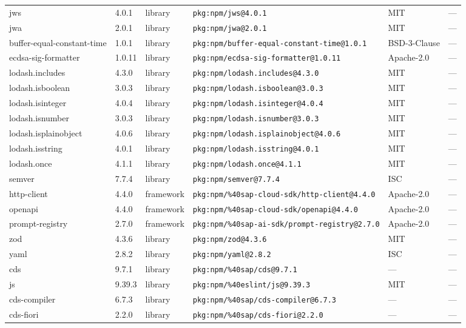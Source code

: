 \documentclass[11pt]{article}
\begin{document}
\begin{longtable}{|l|l|l|p{2.2cm}|l|p{4cm}|}
jws & 4.0.1 & library & \texttt{pkg:npm/jws@4.0.1} & MIT & — \\
jwa & 2.0.1 & library & \texttt{pkg:npm/jwa@2.0.1} & MIT & — \\
buffer-equal-constant-time & 1.0.1 & library & \texttt{pkg:npm/buffer-equal-constant-time@1.0.1} & BSD-3-Clause & — \\
ecdsa-sig-formatter & 1.0.11 & library & \texttt{pkg:npm/ecdsa-sig-formatter@1.0.11} & Apache-2.0 & — \\
lodash.includes & 4.3.0 & library & \texttt{pkg:npm/lodash.includes@4.3.0} & MIT & — \\
lodash.isboolean & 3.0.3 & library & \texttt{pkg:npm/lodash.isboolean@3.0.3} & MIT & — \\
lodash.isinteger & 4.0.4 & library & \texttt{pkg:npm/lodash.isinteger@4.0.4} & MIT & — \\
lodash.isnumber & 3.0.3 & library & \texttt{pkg:npm/lodash.isnumber@3.0.3} & MIT & — \\
lodash.isplainobject & 4.0.6 & library & \texttt{pkg:npm/lodash.isplainobject@4.0.6} & MIT & — \\
lodash.isstring & 4.0.1 & library & \texttt{pkg:npm/lodash.isstring@4.0.1} & MIT & — \\
lodash.once & 4.1.1 & library & \texttt{pkg:npm/lodash.once@4.1.1} & MIT & — \\
semver & 7.7.4 & library & \texttt{pkg:npm/semver@7.7.4} & ISC & — \\
http-client & 4.4.0 & framework & \texttt{pkg:npm/\%40sap-cloud-sdk/http-client@4.4.0} & Apache-2.0 & — \\
openapi & 4.4.0 & framework & \texttt{pkg:npm/\%40sap-cloud-sdk/openapi@4.4.0} & Apache-2.0 & — \\
prompt-registry & 2.7.0 & framework & \texttt{pkg:npm/\%40sap-ai-sdk/prompt-registry@2.7.0} & Apache-2.0 & — \\
zod & 4.3.6 & library & \texttt{pkg:npm/zod@4.3.6} & MIT & — \\
yaml & 2.8.2 & library & \texttt{pkg:npm/yaml@2.8.2} & ISC & — \\
cds & 9.7.1 & library & \texttt{pkg:npm/\%40sap/cds@9.7.1} & — & — \\
js & 9.39.3 & library & \texttt{pkg:npm/\%40eslint/js@9.39.3} & MIT & — \\
cds-compiler & 6.7.3 & library & \texttt{pkg:npm/\%40sap/cds-compiler@6.7.3} & — & — \\
cds-fiori & 2.2.0 & library & \texttt{pkg:npm/\%40sap/cds-fiori@2.2.0} & — & — \\

\end{longtable}
\end{document}
